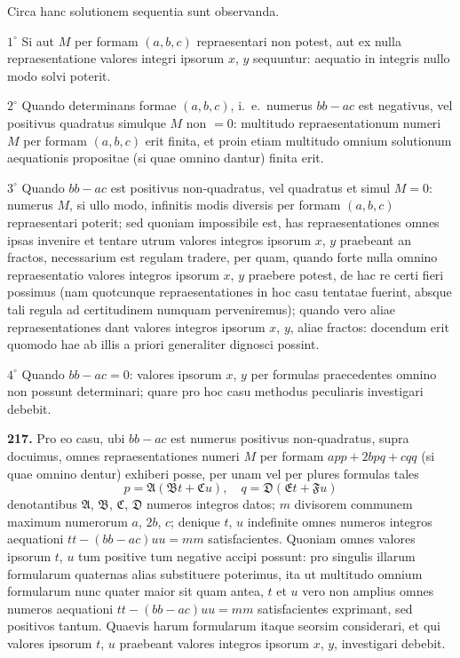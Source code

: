 \documentclass[12pt,a4paper]{article}
\theoremstyle{plain}
\theoremstyle{definition}
\theoremstyle{remark}
\begin{document}
Circa hanc solutionem sequentia sunt observanda.

$1^\circ$ Si aut $M$ per formam $(a,b,c)$ repraesentari non potest, aut ex nulla repraesentatione valores integri ipsorum $x$, $y$ sequuntur: aequatio in integris nullo modo solvi poterit.

$2^\circ$ Quando determinans formae $(a,b,c)$, i.\ e.\ numerus $bb-ac$ est negativus, vel positivus quadratus simulque $M$ non $=0$: multitudo repraesentationum numeri $M$ per formam $(a,b,c)$ erit finita, et proin etiam multitudo omnium solutionum aequationis propositae (si quae omnino dantur) finita erit.

$3^\circ$ Quando $bb-ac$ est positivus non-quadratus, vel quadratus et simul $M=0$: numerus $M$, si ullo modo, infinitis modis diversis per formam $(a,b,c)$ repraesentari poterit; sed quoniam impossibile est, has repraesentationes omnes ipsas invenire et tentare utrum valores integros ipsorum $x$, $y$ praebeant an fractos, necessarium est regulam tradere, per quam, quando forte nulla omnino repraesentatio valores integros ipsorum $x$, $y$ praebere potest, de hac re certi fieri possimus (nam quotcunque repraesentationes in hoc casu tentatae fuerint, absque tali regula ad certitudinem numquam perveniremus); quando vero aliae repraesentationes dant valores integros ipsorum $x$, $y$, aliae fractos: docendum erit quomodo hae ab illis a priori generaliter dignosci possint.

$4^\circ$ Quando $bb-ac=0$: valores ipsorum $x$, $y$ per formulas praecedentes omnino non possunt determinari; quare pro hoc casu methodus peculiaris investigari debebit.

\textbf{217.}
Pro eo casu, ubi $bb-ac$ est numerus positivus non-quadratus, supra docuimus, omnes repraesentationes numeri $M$ per formam $app+2bpq+cqq$ (si quae omnino dentur) exhiberi posse, per unam vel per plures formulas tales
\[
p=\mathfrak{A}(\mathfrak{B}t+\mathfrak{C}u),\quad q=\mathfrak{D}(\mathfrak{E}t+\mathfrak{F}u)
\]
denotantibus $\mathfrak{A}$, $\mathfrak{B}$, $\mathfrak{C}$, $\mathfrak{D}$ numeros integros datos; $m$ divisorem communem maximum numerorum $a$, $2b$, $c$; denique $t$, $u$ indefinite omnes numeros integros aequationi $tt-(bb-ac)uu=mm$ satisfacientes. Quoniam omnes valores ipsorum $t$, $u$ tum positive tum negative accipi possunt: pro singulis illarum formularum quaternas alias substituere poterimus, ita ut multitudo omnium formularum nunc quater maior sit quam antea, $t$ et $u$ vero non amplius omnes numeros aequationi $tt-(bb-ac)uu=mm$ satisfacientes exprimant, sed positivos tantum. Quaevis harum formularum itaque seorsim considerari, et qui valores ipsorum $t$, $u$ praebeant valores integros ipsorum $x$, $y$, investigari debebit.
\end{document}
